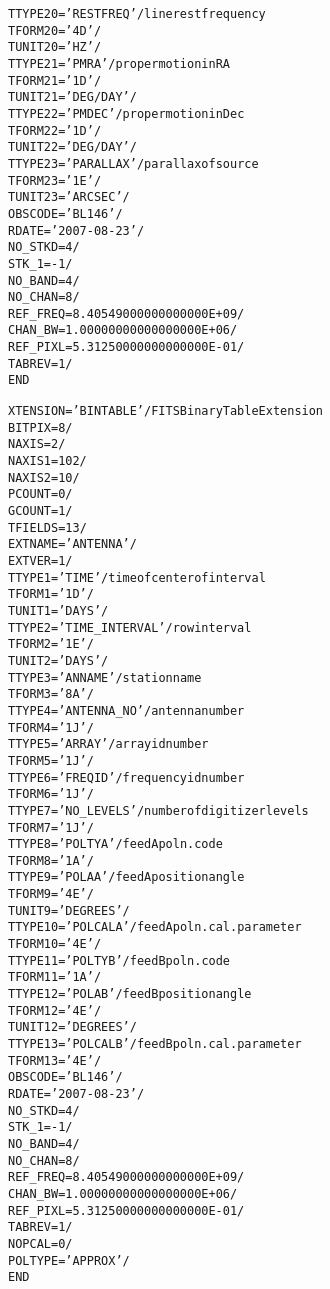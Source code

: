 \documentclass[twoside]{article}
\begin{document}
\begin{alltt}
TTYPE20 = 'RESTFREQ'           / line rest frequency
TFORM20 = '4D      '           /
TUNIT20 = 'HZ      '           /
TTYPE21 = 'PMRA    '           / proper motion in RA
TFORM21 = '1D      '           /
TUNIT21 = 'DEG/DAY '           /
TTYPE22 = 'PMDEC   '           / proper motion in Dec
TFORM22 = '1D      '           /
TUNIT22 = 'DEG/DAY '           /
TTYPE23 = 'PARALLAX'           / parallax of source
TFORM23 = '1E      '           /
TUNIT23 = 'ARCSEC  '           /
OBSCODE = 'BL146   '           /
RDATE   = '2007-08-23'         /
NO_STKD =                    4 /
STK_1   =                   -1 /
NO_BAND =                    4 /
NO_CHAN =                    8 /
REF_FREQ=   8.40549000000000000E+09 /
CHAN_BW =   1.00000000000000000E+06 /
REF_PIXL=   5.31250000000000000E-01 /
TABREV  =                    1 /
END
\end{alltt}

\begin{alltt}
XTENSION= 'BINTABLE'           / FITS Binary Table Extension
BITPIX  =                    8 /
NAXIS   =                    2 /
NAXIS1  =                  102 /
NAXIS2  =                   10 /
PCOUNT  =                    0 /
GCOUNT  =                    1 /
TFIELDS =                   13 /
EXTNAME = 'ANTENNA '           /
EXTVER  =                    1 /
TTYPE1  = 'TIME    '           / time of center of interval
TFORM1  = '1D      '           /
TUNIT1  = 'DAYS    '           /
TTYPE2  = 'TIME_INTERVAL'      / row interval
TFORM2  = '1E      '           /
TUNIT2  = 'DAYS    '           /
TTYPE3  = 'ANNAME  '           / station name
TFORM3  = '8A      '           /
TTYPE4  = 'ANTENNA_NO'         / antenna number
TFORM4  = '1J      '           /
TTYPE5  = 'ARRAY   '           / array id number
TFORM5  = '1J      '           /
TTYPE6  = 'FREQID  '           / frequency id number
TFORM6  = '1J      '           /
TTYPE7  = 'NO_LEVELS'          / number of digitizer levels
TFORM7  = '1J      '           /
TTYPE8  = 'POLTYA  '           / feed A poln. code
TFORM8  = '1A      '           /
TTYPE9  = 'POLAA   '           / feed A position angle
TFORM9  = '4E      '           /
TUNIT9  = 'DEGREES '           /
TTYPE10 = 'POLCALA '           / feed A poln. cal. parameter
TFORM10 = '4E      '           /
TTYPE11 = 'POLTYB  '           / feed B poln. code
TFORM11 = '1A      '           /
TTYPE12 = 'POLAB   '           / feed B position angle
TFORM12 = '4E      '           /
TUNIT12 = 'DEGREES '           /
TTYPE13 = 'POLCALB '           / feed B poln. cal. parameter
TFORM13 = '4E      '           /
OBSCODE = 'BL146   '           /
RDATE   = '2007-08-23'         /
NO_STKD =                    4 /
STK_1   =                   -1 /
NO_BAND =                    4 /
NO_CHAN =                    8 /
REF_FREQ=   8.40549000000000000E+09 /
CHAN_BW =   1.00000000000000000E+06 /
REF_PIXL=   5.31250000000000000E-01 /
TABREV  =                    1 /
NOPCAL  =                    0 /
POLTYPE = 'APPROX  '           /
END
\end{alltt}
\end{document}
